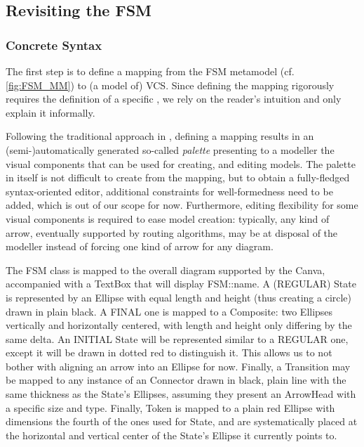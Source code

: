 \subsection{Revisiting the \textsf{FSM}}
\label{sec:Proposal-FSM}



\subsubsection{Concrete Syntax}
\label{sec:Proposal-FSM-CS}


The first step is to define a mapping from the \textsf{FSM} metamodel (cf. \autoref{fig:FSM_MM})
to (a model of) \textsf{VCS}. Since defining the mapping rigorously requires the
definition of a specific \DSL, we rely on the reader's intuition and only explain 
it informally.

Following the traditional approach in \MDE, defining a mapping results in an 
(semi-)automatically generated so-called \emph{palette} presenting to a modeller
the visual components that can be used for creating, and editing models. The palette
in itself is not difficult to create from the mapping, but to obtain a fully-fledged
syntax-oriented editor, additional constraints for well-formedness need to be added,
which is out of our scope for now. Furthermore, editing flexibility for some visual
components is required to ease model creation: typically, any kind of arrow, eventually
supported by routing algorithms, may be at disposal of the modeller instead of forcing
one kind of arrow for any diagram.

The \textsf{FSM} class is mapped to the overall diagram supported by the \textsf{Canva},
accompanied with a \textsf{TextBox} that will display \textsf{FSM::name}.
A (\textsf{REGULAR}) \textsf{State} is represented by an \textsf{Ellipse} with equal \textsf{length}
and \textsf{height} (thus creating a circle) drawn in plain black. A \textsf{FINAL}
one is mapped to a \textsf{Composite}: two \textsf{Ellipse}s vertically and horizontally
centered, with \textsf{length} and \textsf{height} only differing by the same delta.
An \textsf{INITIAL} \textsf{State} will be represented similar to a \textsf{REGULAR}
one, except it will be drawn in dotted red to distinguish it. This allows us to not
bother with aligning an arrow into an \textsf{Ellipse} for now. Finally, a 
\textsf{Transition} may be mapped to any instance of an \textsf{Connector} drawn
in black, plain line with the same thickness as the \textsf{State}'s \textsf{Ellipse}s,
assuming they present an \textsf{ArrowHead} with a specific size and type. Finally,
\textsf{Token} is mapped to a plain red \textsf{Ellipse} with dimensions the fourth
of the ones used for \textsf{State}, and are systematically placed at the horizontal
and vertical center of the \textsf{State}'s \textsf{Ellipse} it \textsf{current}ly
points to.


